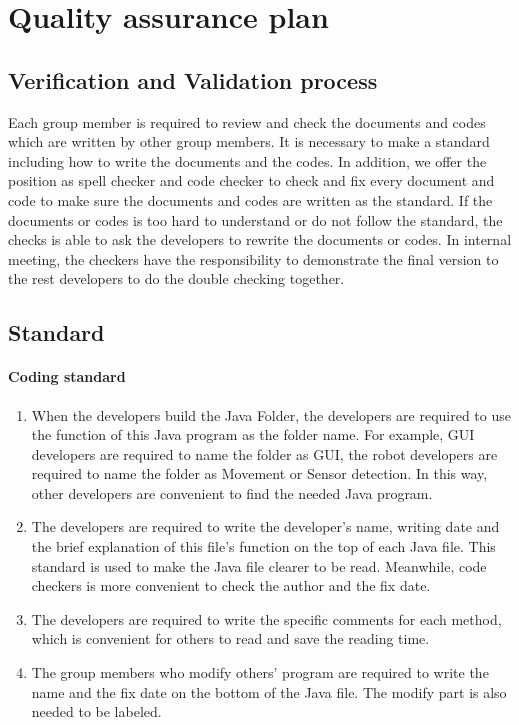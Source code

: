 \documentclass[11pt, a4paper]{report}
\begin{document}
\section{Quality assurance plan}
\subsection{Verification and Validation process}
Each group member is required to review and check the documents and codes which are written by other group members. It is necessary to make a standard including how to write the documents and the codes. In addition, we offer the position as spell checker and code checker to check and fix every document and code to make sure the documents and codes are written as the standard. If the documents or codes is too hard to understand or do not follow the standard, the checks is able to ask the developers to rewrite the documents or codes. In internal meeting, the checkers have the responsibility to demonstrate the final version to the rest developers to do the double checking together.
\subsection{Standard}
\paragraph{Coding standard}

\begin{enumerate}
	\item When the developers build the Java Folder, the developers are required to use the function of this Java program as the folder name. For example, GUI developers are required to name the folder as GUI, the robot developers are required to name the folder as Movement or Sensor detection. In this way, other developers are convenient to find the needed Java program.
	\item The developers are required to write the developer's name, writing date and the brief explanation of this file's function on the top of each Java file. This standard is used to make the Java file clearer to be read. Meanwhile, code checkers is more convenient to check the author and the fix date.  
	\item The developers are required to write the specific comments for each method, which is convenient for others to read and save the reading time.
	\item The group members who modify others' program are required to write the name and the fix date on the bottom of the Java file. The modify part is also needed to be labeled.
\end{enumerate}
\end{document}
